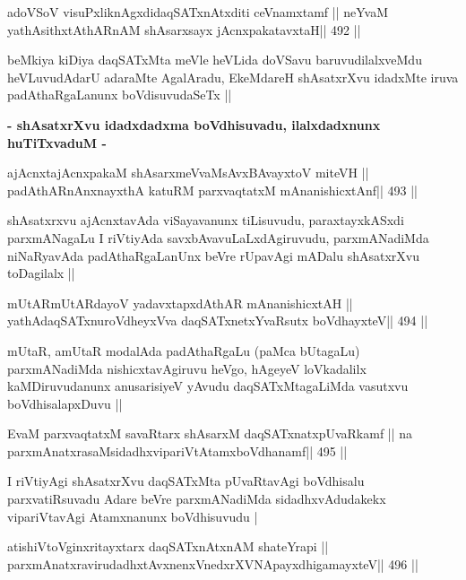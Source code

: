 \begin{shl}
adoVSoV visuPxliknAgxdidaqSATxnAtxditi ceVnamxtamf ||
neYvaM yathAsithxtAthARnAM shAsarxsayx jAcnxpakatavxtaH\hfill || 492 ||
\end{shl}

\begin{artha}
beMkiya kiDiya daqSATxMta meVle heVLida doVSavu baruvudilalxveMdu
heVLuvudAdarU adaraMte AgalAradu, EkeMdareH shAsatxrXvu idadxMte iruva
padAthaRgaLanunx boVdisuvudaSeTx ||
\end{artha}

\medskip
\centerline{\textbf{- shAsatxrXvu idadxdadxma boVdhisuvadu, ilalxdadxnunx huTiTxvaduM -}}

\begin{shl}
ajAcnxtajAcnxpakaM shAsarxmeVvaMsAvxBAvayxtoV miteVH ||
padAthARnAnxnayxthA katuRM parxvaqtatxM mAnanishicxtAnf\hfill || 493 ||
\end{shl}

\begin{artha}
shAsatxrxvu ajAcnxtavAda viSayavanunx tiLisuvudu, paraxtayxkASxdi
parxmANagaLu I riVtiyAda savxbAvavuLaLxdAgiruvudu, parxmANadiMda
niNaRyavAda padAthaRgaLanUnx beVre rUpavAgi mADalu shAsatxrXvu
toDagilalx ||
\end{artha}

\begin{shl}
mUtARmUtARdayoV yadavxtapxdAthAR mAnanishicxtAH ||
yathAdaqSATxnuroVdheyxVva daqSATxnetxYvaRsutx boVdhayxteV\hfill || 494 ||
\end{shl}

\begin{artha}
mUtaR, amUtaR modalAda padAthaRgaLu (paMca bUtagaLu) parxmANadiMda
nishicxtavAgiruvu heVgo, hAgeyeV loVkadalilx kaMDiruvudanunx
anusarisiyeV yAvudu daqSATxMtagaLiMda vasutxvu boVdhisalapxDuvu ||
\end{artha}

\begin{shl}
EvaM parxvaqtatxM savaRtarx shAsarxM daqSATxnatxpUvaRkamf ||
na parxmAnatxrasaMsidadhxvipariVtAtamxboVdhanamf\hfill || 495 ||
\end{shl}

\begin{artha}
I riVtiyAgi shAsatxrXvu daqSATxMta pUvaRtavAgi boVdhisalu
parxvatiRsuvadu Adare beVre parxmANadiMda sidadhxvAdudakekx
vipariVtavAgi Atamxnanunx boVdhisuvudu |
\end{artha}

\begin{shl}
atishiVtoV\s ginxritayxtarx daqSATxnAtxnAM shateYrapi ||
parxmAnatxravirudadhxtAvxnenxVnedxrXVNApayxdhigamayxteV\hfill || 496 ||
\end{shl}

